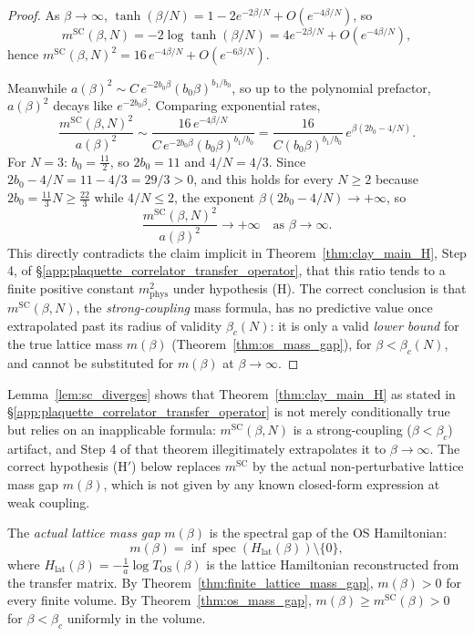 \begin{proof}
As $\beta\to\infty$, $\tanh(\beta/N)=1-2e^{-2\beta/N}+O(e^{-4\beta/N})$, so
\[
m^{\mathrm{SC}}(\beta,N)=-2\log\tanh(\beta/N)=4e^{-2\beta/N}+O(e^{-4\beta/N}),
\]
hence $m^{\mathrm{SC}}(\beta,N)^{2}=16\,e^{-4\beta/N}+O(e^{-6\beta/N})$.

Meanwhile $a(\beta)^{2}\sim C\,e^{-2b_{0}\beta}(b_{0}\beta)^{b_{1}/b_{0}}$, so
up to the polynomial prefactor, $a(\beta)^{2}$ decays like $e^{-2b_{0}\beta}$.
Comparing exponential rates,
\[
\frac{m^{\mathrm{SC}}(\beta,N)^{2}}{a(\beta)^{2}}
\sim \frac{16\,e^{-4\beta/N}}{C\,e^{-2b_{0}\beta}(b_{0}\beta)^{b_{1}/b_{0}}}
= \frac{16}{C(b_{0}\beta)^{b_{1}/b_{0}}}\,e^{\beta(2b_{0}-4/N)}.
\]
For $N=3$: $b_{0}=\frac{11}{2}$, so $2b_{0}=11$ and $4/N=4/3$. Since
$2b_{0}-4/N=11-4/3=29/3>0$, and this holds for every $N\ge2$ because
$2b_{0}=\frac{11}{3}N\ge\frac{22}{3}$ while $4/N\le 2$, the exponent
$\beta(2b_{0}-4/N)\to+\infty$, so
\[
\frac{m^{\mathrm{SC}}(\beta,N)^{2}}{a(\beta)^{2}}\longrightarrow +\infty
\quad\text{as }\beta\to\infty.
\]
This directly contradicts the claim implicit in Theorem~\ref{thm:clay_main_H},
Step 4, of \S\ref{app:plaquette_correlator_transfer_operator}, that this ratio
tends to a finite positive constant $m_{\mathrm{phys}}^{2}$ under hypothesis
(H). The correct conclusion is that $m^{\mathrm{SC}}(\beta,N)$, the
\emph{strong-coupling} mass formula, has no predictive value once extrapolated
past its radius of validity $\beta_{c}(N)$: it is only a valid \emph{lower
bound} for the true lattice mass $m(\beta)$ (Theorem~\ref{thm:os_mass_gap}),
for $\beta<\beta_{c}(N)$, and cannot be substituted for $m(\beta)$ at
$\beta\to\infty$.
\end{proof}

\begin{remark}
\label{rem:sc_interp}
Lemma~\ref{lem:sc_diverges} shows that Theorem~\ref{thm:clay_main_H} as stated
in \S\ref{app:plaquette_correlator_transfer_operator} is not merely
conditionally true but relies on an inapplicable formula:
$m^{\mathrm{SC}}(\beta,N)$ is a strong-coupling ($\beta<\beta_{c}$) artifact,
and Step 4 of that theorem illegitimately extrapolates it to $\beta\to\infty$.
The correct hypothesis (H$'$) below replaces $m^{\mathrm{SC}}$ by the actual
non-perturbative lattice mass gap $m(\beta)$, which is not given by any known
closed-form expression at weak coupling.
\end{remark}

\begin{definition}
\label{def:actual_mass_gap}
The \emph{actual lattice mass gap} $m(\beta)$ is the spectral gap of the
OS Hamiltonian:
\[
m(\beta) = \inf\operatorname{spec}(H_{\mathrm{lat}}(\beta))\setminus\{0\},
\]
where $H_{\mathrm{lat}}(\beta)=-\frac{1}{a}\log T_{\mathrm{OS}}(\beta)$ is the
lattice Hamiltonian reconstructed from the transfer matrix. By
Theorem~\ref{thm:finite_lattice_mass_gap}, $m(\beta)>0$ for every finite volume.
By Theorem~\ref{thm:os_mass_gap}, $m(\beta)\ge m^{\mathrm{SC}}(\beta)>0$ for
$\beta<\beta_{c}$ uniformly in the volume.
\end{definition}

